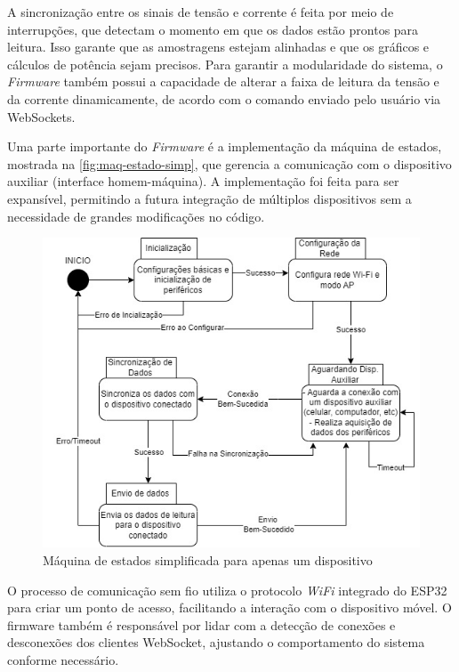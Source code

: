 A sincronização entre os sinais de tensão e corrente é feita por meio de interrupções, que detectam o momento em que os dados estão prontos para leitura. Isso garante que as amostragens estejam alinhadas e que os gráficos e cálculos de potência sejam precisos. Para garantir a modularidade do sistema, o \textit{Firmware} também possui a capacidade de alterar a faixa de leitura da tensão e da corrente dinamicamente, de acordo com o comando enviado pelo usuário via WebSockets.

Uma parte importante do \textit{Firmware} é a implementação da máquina de estados, mostrada na \autoref{fig:maq-estado-simp}, que gerencia a comunicação com o dispositivo auxiliar (interface homem-máquina). A implementação foi feita para ser expansível, permitindo a futura integração de múltiplos dispositivos sem a necessidade de grandes modificações no código.

\begin{figure}[htb!]
    \caption{Máquina de estados simplificada para apenas um dispositivo}
    \label{fig:maq-estado-simp}
    \includegraphics[width=1.0\textwidth]{figuras/Maquina-Estados-Simplificada.jpg}
    \fonte{}
\end{figure}

O processo de comunicação sem fio utiliza o protocolo \textit{WiFi} integrado do ESP32 para criar um ponto de acesso, facilitando a interação com o dispositivo móvel. O firmware também é responsável por lidar com a detecção de conexões e desconexões dos clientes WebSocket, ajustando o comportamento do sistema conforme necessário.

